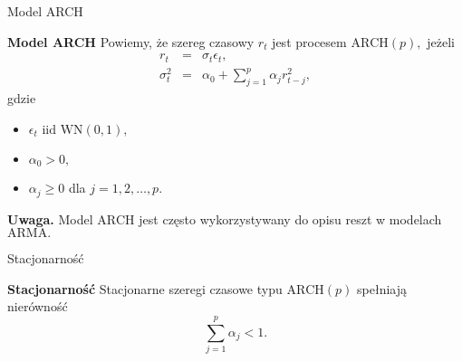 \documentclass[a4paper, 11pt]{beamer}
\begin{document}
	\begin{frame}{Model ARCH}
		\begin{block}{\textbf{Model ARCH}}
			Powiemy, że szereg czasowy $r_t$ jest procesem $\mbox{ARCH}\left(p\right),$ jeżeli \begin{eqnarray*}
				r_t & = & \sigma_t \epsilon_t,\\
				\sigma^2_t & = & \alpha_0 + \sum_{j=1}^{p} \alpha_j r_{t-j}^2,
			\end{eqnarray*} gdzie
			\begin{itemize}
				\item $\epsilon_t \mbox{ iid } \mbox{WN}\left(0, 1\right),$
				\item $\alpha_0 > 0,$
				\item $\alpha_j \geq 0$ dla $j=1,2,\ldots,p.$
			\end{itemize}
		\end{block}
		\begin{alert}{\textbf{Uwaga.}}
			Model $\mbox{ARCH}$ jest często wykorzystywany do opisu reszt w modelach $\mbox{ARMA}.$
		\end{alert}
	\end{frame}
	
	\begin{frame}{Stacjonarność}
		\begin{block}{\textbf{Stacjonarność}}
			Stacjonarne szeregi czasowe typu $\mbox{ARCH}\left(p\right)$ spełniają nierówność \[
				\sum_{j=1}^{p} \alpha_j < 1.
			\]
		\end{block}
	\end{frame}
	
\end{document}
